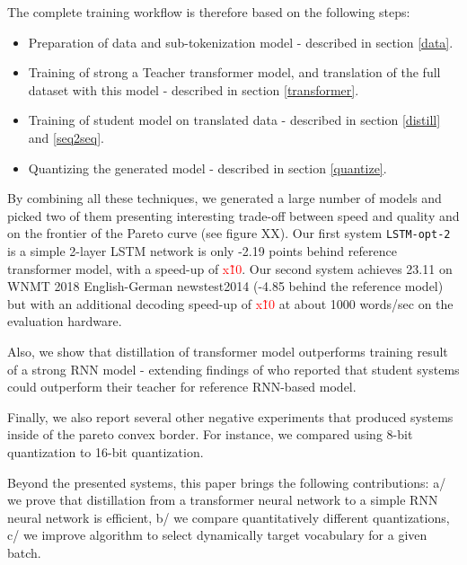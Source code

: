 \documentclass[11pt,a4paper]{article}
\begin{document}
The complete training workflow is therefore based on the following steps:
\begin{itemize}
\item Preparation of data and sub-tokenization model - described in section \ref{data}.
\item Training of strong a Teacher transformer model, and translation of the full dataset with this model - described in section \ref{transformer}.
\item Training of student model on translated data - described in section \ref{distill} and \ref{seq2seq}.
\item Quantizing the generated model - described in section \ref{quantize}.
\end{itemize}

By combining all these techniques, we generated a large number of models and picked two of them presenting interesting trade-off between speed and quality and on the frontier of the Pareto curve (see figure XX). Our first system {\tt LSTM-opt-2} is a simple 2-layer LSTM network is only -2.19 points behind reference transformer model, with a speed-up of \textcolor{red}{x\~10}. Our second system achieves 23.11 on WNMT 2018 English-German newstest2014 (-4.85 behind the reference model) but  with an additional decoding speed-up of \textcolor{red}{x\~10} at about 1000 words/sec on the evaluation hardware.

Also, we show that distillation of transformer model outperforms training result of a strong RNN model - extending findings of \cite{DBLP:journals/corr/CregoS16} who reported that student systems could outperform their teacher for reference RNN-based model.

Finally, we also report several other negative experiments that produced systems inside of the pareto convex border. For instance, we compared using 8-bit quantization to 16-bit quantization.

Beyond the presented systems, this paper brings the following contributions: a/ we prove that distillation from a transformer neural network to a simple RNN neural network is efficient, b/ we compare quantitatively different quantizations, c/ we improve algorithm to select dynamically target vocabulary for a given batch.
\end{document}

